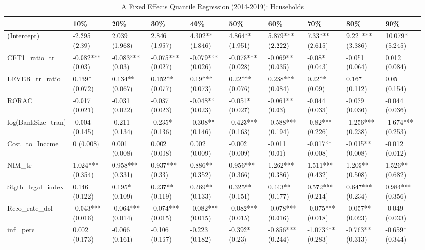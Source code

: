 \begin{table}[ht]
\centering
\caption{A Fixed Effects Quantile Regression (2014-2019): Households} 
\begingroup\small
\begin{tabular}{llllllllll}
  \toprule
 & 10\% & 20\% & 30\% & 40\% & 50\% & 60\% & 70\% & 80\% & 90\% \\ 
  \midrule
(Intercept) & -2.295 (2.39) & 2.039 (1.968) & 2.846 (1.957) & 4.302** (1.846) & 4.864** (1.951) & 5.879*** (2.222) & 7.33*** (2.615) & 9.221*** (3.386) & 10.079* (5.245) \\ 
  CET1\_ratio\_tr & -0.082*** (0.03) & -0.083*** (0.03) & -0.075*** (0.027) & -0.079*** (0.026) & -0.078*** (0.028) & -0.069** (0.035) & -0.08* (0.043) & -0.051 (0.064) & 0.012 (0.084) \\ 
  LEVER\_tr\_ratio & 0.139* (0.072) & 0.134** (0.067) & 0.152** (0.077) & 0.19*** (0.073) & 0.22*** (0.076) & 0.238*** (0.084) & 0.22** (0.09) & 0.167 (0.112) & 0.05 (0.154) \\ 
  RORAC & -0.017 (0.021) & -0.031 (0.022) & -0.037 (0.023) & -0.048** (0.023) & -0.051* (0.027) & -0.061** (0.03) & -0.044 (0.033) & -0.039 (0.036) & -0.044 (0.036) \\ 
  log(BankSize\_tran) & -0.004 (0.145) & -0.211 (0.134) & -0.235* (0.136) & -0.308** (0.146) & -0.423*** (0.163) & -0.588*** (0.194) & -0.82*** (0.226) & -1.256*** (0.238) & -1.674*** (0.253) \\ 
  Cost\_to\_Income & 0 (0.008) & 0.001 (0.008) & 0.002 (0.008) & 0.002 (0.009) & -0.002 (0.009) & -0.011 (0.01) & -0.017** (0.008) & -0.015** (0.008) & -0.012 (0.012) \\ 
  NIM\_tr & 1.024*** (0.354) & 0.958*** (0.331) & 0.937*** (0.33) & 0.886** (0.352) & 0.956*** (0.366) & 1.262*** (0.386) & 1.511*** (0.432) & 1.205** (0.508) & 1.526** (0.682) \\ 
  Stgth\_legal\_index & 0.146 (0.122) & 0.195* (0.109) & 0.237** (0.119) & 0.269** (0.133) & 0.325** (0.151) & 0.443** (0.177) & 0.572*** (0.214) & 0.647*** (0.234) & 0.984*** (0.356) \\ 
  Reco\_rate\_dol & -0.043*** (0.016) & -0.064*** (0.014) & -0.074*** (0.015) & -0.082*** (0.015) & -0.082*** (0.015) & -0.078*** (0.016) & -0.075*** (0.018) & -0.057** (0.023) & -0.049 (0.033) \\ 
  infl\_perc & 0.002 (0.173) & -0.066 (0.161) & -0.106 (0.167) & -0.223 (0.182) & -0.392* (0.23) & -0.856*** (0.244) & -1.073*** (0.283) & -0.763** (0.313) & -0.659* (0.344) \\ 

\end{tabular}
\end{table}
